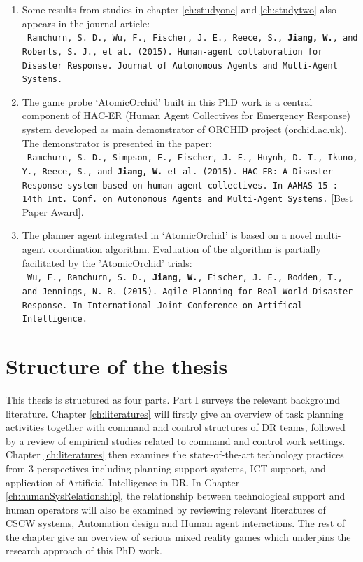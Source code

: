 \begin{enumerate}
\item Some results from studies in chapter \ref{ch:studyone} and \ref{ch:studytwo} also appears in the journal article:\\
\texttt{ \footnotesize Ramchurn, S. D., Wu, F., Fischer, J. E., Reece, S., \textbf{Jiang, W.}, and Roberts, S. J., et al. (2015). Human-agent collaboration for Disaster Response. Journal of Autonomous Agents and Multi-Agent Systems.}\\

\item The game probe `AtomicOrchid' built in this PhD work is a central component of HAC-ER (Human Agent Collectives for Emergency Response) system  developed as main demonstrator of ORCHID project (orchid.ac.uk). The demonstrator is presented in the paper:\\
\texttt{ \footnotesize Ramchurn, S. D., Simpson, E., Fischer, J. E., Huynh, D. T., Ikuno, Y., Reece, S., and \textbf{ Jiang, W.} et al. (2015). HAC-ER: A Disaster Response system based on human-agent collectives. In AAMAS-15 : 14th Int. Conf. on Autonomous Agents and Multi-Agent Systems.} [Best Paper Award].\\ 

\item The planner agent integrated in `AtomicOrchid' is based on a novel multi-agent coordination algorithm. Evaluation of the algorithm is partially facilitated by the 'AtomicOrchid' trials:\\
 \texttt{ \footnotesize Wu, F., Ramchurn, S. D., \textbf{Jiang, W.}, Fischer, J. E., Rodden, T., and Jennings, N. R. (2015). Agile Planning for Real-World Disaster Response. In International Joint Conference on Artifical Intelligence.}

\end{enumerate} 

\section{Structure of the thesis}
This thesis is structured as four parts. Part I surveys the relevant background literature. Chapter \ref{ch:literatures} will firstly give an overview of task planning activities together with command and control structures of \ac{DR} teams, followed by a review of empirical studies related to command and control work settings. Chapter \ref{ch:literatures} then examines the state-of-the-art technology practices from 3 perspectives including planning support systems, \ac{ICT} support, and application of Artificial Intelligence in \ac{DR}. In Chapter \ref{ch:humanSysRelationship}, the relationship between technological support and human operators will also be examined by reviewing relevant literatures of \ac{CSCW} systems, Automation design and Human agent interactions. The rest of the chapter give an overview of serious mixed reality games which underpins the research approach of this PhD work.\\

